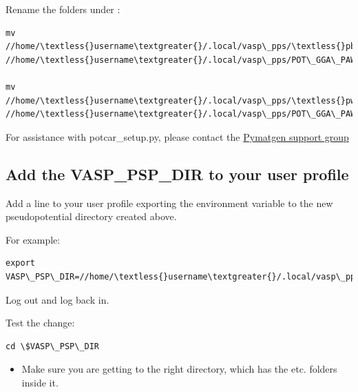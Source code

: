 \documentclass[letterpaper,10pt,english]{sphinxmanual}
\begin{document}
Rename the folders under :

\begin{Verbatim}[commandchars=\\\{\}]
mv //home/\textless{}username\textgreater{}/.local/vasp\_pps/\textless{}pbe\_name\textgreater{} //home/\textless{}username\textgreater{}/.local/vasp\_pps/POT\_GGA\_PAW\_PBE

mv //home/\textless{}username\textgreater{}/.local/vasp\_pps/\textless{}pw91\_name\textgreater{} //home/\textless{}username\textgreater{}/.local/vasp\_pps/POT\_GGA\_PAW\_PW91
\end{Verbatim}

For assistance with potcar\_setup.py, please contact the
\href{https://groups.google.com/forum/\#!forum/pymatgen}{Pymatgen support group}


\subsection{Add the VASP\_PSP\_DIR to your user profile}
\label{1_0_installation:add-the-vasp-psp-dir-to-your-user-profile}
Add a line to your user profile exporting the environment variable  to the new pseudopotential directory created above.

For example:

\begin{Verbatim}[commandchars=\\\{\}]
export VASP\_PSP\_DIR=//home/\textless{}username\textgreater{}/.local/vasp\_pps
\end{Verbatim}

Log out and log back in.

Test the change:

\begin{Verbatim}[commandchars=\\\{\}]
cd \$VASP\_PSP\_DIR
\end{Verbatim}
\begin{itemize}
\item {} 
Make sure you are getting to the right directory, which has the  etc. folders inside it.

\end{itemize}
\end{document}
